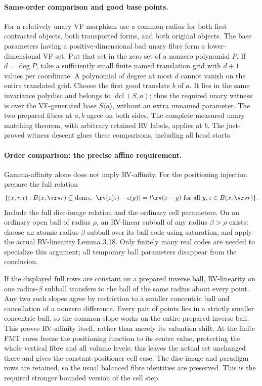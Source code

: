 \paragraph{Same-order comparison and good base points.}
For a relatively unary VF morphism use a common radius for both first
contracted objects, both transported forms, and both original objects.
The base parameters having a positive-dimensional bad unary fibre form
a lower-dimensional VF set. Put that set in the zero set of a nonzero
polynomial $P$. If $d=\deg P$, take a sufficiently small finite named
translation grid with $d+1$ values per coordinate. A polynomial of degree
at most $d$ cannot vanish on the entire translated grid. Choose the
first good translate $b$ of $a$. It lies in the same invariance polydisc
and belongs to $\operatorname{dcl}(S,a)$; thus the required unary witness
is over the VF-generated base $S\langle a\rangle$, without an extra
unnamed parameter. The two prepared fibres at $a,b$ agree on both sides.
The complete measured unary matching theorem, with arbitrary retained
RV labels, applies at $b$. The just-proved witness descent glues these
comparisons, including all head starts.

\paragraph{Order comparison: the precise affine requirement.}
Gamma-affinity alone does not imply RV-affinity. For the positioning
injection prepare the full relation
\[
 \{(x,r,t): B(x,\vrv r)\subseteq\operatorname{dom}\epsilon,
 \ \rv(\epsilon(z)-\epsilon(y))=t\rv(z-y)
 \text{ for all }y,z\in B(x,\vrv r)\}.
\]
Include the full disc-image relation and the ordinary cell parameters.
On an ordinary open ball of radius $\rho$, an RV-linear subball of any
radius $\beta>\rho$ exists: choose an atomic radius-$\beta$ subball over
its ball code using saturation, and apply the actual RV-linearity
Lemma 3.18. Only finitely many real codes are needed to specialize this
argument; all temporary ball parameters disappear from the conclusion.

If the displayed full rows are constant on a prepared inverse ball,
RV-linearity on one radius-$\beta$ subball transfers to the ball of the
same radius about every point. Any two such slopes agree by restriction
to a smaller concentric ball and cancellation of a nonzero difference.
Every pair of points lies in a strictly smaller concentric ball, so the
common slope works on the entire prepared inverse ball. This proves
RV-affinity itself, rather than merely its valuation shift. At the finite
FMT cores freeze the positioning function to its centre value, protecting
the whole vertical fibre and all volume levels; this leaves the actual
set unchanged there and gives the constant-positioner cell case.
The disc-image and paradigm rows are retained, so the usual balanced
fibre identities are preserved. This is the required stronger bounded
version of the cell step.

